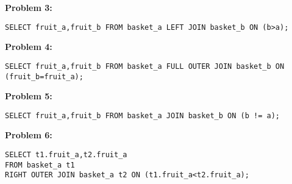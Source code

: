 \documentclass[10pt]{article}
\theoremstyle{definition}
\begin{document}
\newpage
\textbf{Problem 3:}
\begin{lstlisting}
SELECT fruit_a,fruit_b FROM basket_a LEFT JOIN basket_b ON (b>a);
\end{lstlisting}

\vspace{3in}
\textbf{Problem 4:}
\begin{lstlisting}
SELECT fruit_a,fruit_b FROM basket_a FULL OUTER JOIN basket_b ON (fruit_b=fruit_a);
\end{lstlisting}

\newpage
\textbf{Problem 5:}
\begin{lstlisting}
SELECT fruit_a,fruit_b FROM basket_a JOIN basket_b ON (b != a);
\end{lstlisting}

\vspace{3in}
\textbf{Problem 6:}
\begin{lstlisting}
SELECT t1.fruit_a,t2.fruit_a
FROM basket_a t1
RIGHT OUTER JOIN basket_a t2 ON (t1.fruit_a<t2.fruit_a);
\end{lstlisting}
\end{document}
